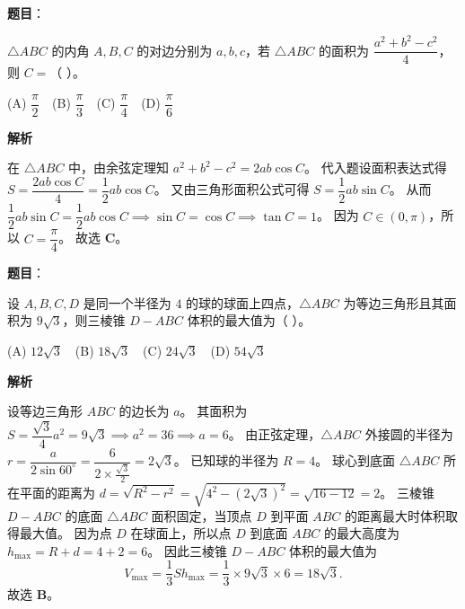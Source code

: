 \begin{answer}

\textbf{题目}：

$\triangle ABC$ 的内角 $A, B, C$ 的对边分别为 $a, b, c$，若 $\triangle ABC$ 的面积为 $\dfrac{a^2 + b^2 - c^2}{4}$，则 $C =$（ ）。

(A) $\dfrac\pi2$　(B) $\dfrac\pi3$　(C) $\dfrac\pi4$　(D) $\dfrac\pi6$

\textbf{解析}

在 $\triangle ABC$ 中，由余弦定理知 $a^2 + b^2 - c^2 = 2ab\cos C$。
代入题设面积表达式得 $S = \dfrac{2ab\cos C}{4} = \dfrac12 ab\cos C$。
又由三角形面积公式可得 $S = \dfrac12 ab\sin C$。
从而 $\dfrac12 ab\sin C = \dfrac12 ab\cos C \implies \sin C = \cos C \implies \tan C = 1$。
因为 $C \in (0, \pi)$，所以 $C = \dfrac\pi4$。
故选 \textbf{C}。


\end{answer}
\begin{answer}

\textbf{题目}：

设 $A, B, C, D$ 是同一个半径为 $4$ 的球的球面上四点，$\triangle ABC$ 为等边三角形且其面积为 $9\sqrt3$，则三棱锥 $D - ABC$ 体积的最大值为（ ）。

(A) $12\sqrt3$　(B) $18\sqrt3$　(C) $24\sqrt3$　(D) $54\sqrt3$

\textbf{解析}

设等边三角形 $ABC$ 的边长为 $a$。
其面积为 $S = \dfrac{\sqrt3}{4}a^2 = 9\sqrt3 \implies a^2 = 36 \implies a = 6$。
由正弦定理，$\triangle ABC$ 外接圆的半径为 $r = \dfrac{a}{2\sin 60^\circ} = \dfrac{6}{2\times \frac{\sqrt3}{2}} = 2\sqrt3$。
已知球的半径为 $R = 4$。
球心到底面 $\triangle ABC$ 所在平面的距离为 $d = \sqrt{R^2 - r^2} = \sqrt{4^2 - (2\sqrt3)^2} = \sqrt{16 - 12} = 2$。
三棱锥 $D - ABC$ 的底面 $\triangle ABC$ 面积固定，当顶点 $D$ 到平面 $ABC$ 的距离最大时体积取得最大值。
因为点 $D$ 在球面上，所以点 $D$ 到底面 $ABC$ 的最大高度为 $h_{\max} = R + d = 4 + 2 = 6$。
因此三棱锥 $D - ABC$ 体积的最大值为
\nopagebreak[4]
\[V_{\max} = \dfrac13 S h_{\max} = \dfrac13 \times 9\sqrt3 \times 6 = 18\sqrt3.\]
故选 \textbf{B}。


\par\medskip

\end{answer}

